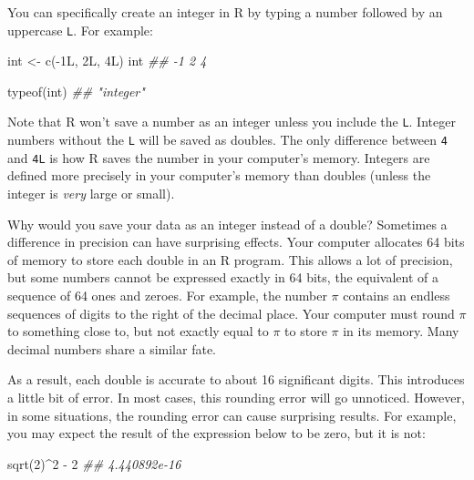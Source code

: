 \documentclass[
  letterpaper,
  DIV=11,
  numbers=noendperiod]{scrbook}
\newenvironment{Shaded}{\begin{snugshade}}{\end{snugshade}}
\newcommand{\DecValTok}[1]{\textcolor[rgb]{0.68,0.00,0.00}{#1}}
\newcommand{\DocumentationTok}[1]{\textcolor[rgb]{0.37,0.37,0.37}{\textit{#1}}}
\newcommand{\FunctionTok}[1]{\textcolor[rgb]{0.28,0.35,0.67}{#1}}
\newcommand{\NormalTok}[1]{\textcolor[rgb]{0.00,0.23,0.31}{#1}}
\newcommand{\OtherTok}[1]{\textcolor[rgb]{0.00,0.23,0.31}{#1}}
\newcommand{\SpecialCharTok}[1]{\textcolor[rgb]{0.37,0.37,0.37}{#1}}
\begin{document}
You can specifically create an integer in R by typing a number followed
by an uppercase \texttt{L}. For example:

\begin{Shaded}
\begin{Highlighting}[]
\NormalTok{int }\OtherTok{\textless{}{-}} \FunctionTok{c}\NormalTok{(}\SpecialCharTok{{-}}\DecValTok{1}\NormalTok{L, }\DecValTok{2}\NormalTok{L, }\DecValTok{4}\NormalTok{L)}
\NormalTok{int}
\DocumentationTok{\#\# {-}1  2  4}

\FunctionTok{typeof}\NormalTok{(int)}
\DocumentationTok{\#\# "integer"}
\end{Highlighting}
\end{Shaded}

Note that R won't save a number as an integer unless you include the
\texttt{L}. Integer numbers without the \texttt{L} will be saved as
doubles. The only difference between \texttt{4} and \texttt{4L} is how R
saves the number in your computer's memory. Integers are defined more
precisely in your computer's memory than doubles (unless the integer is
\emph{very} large or small).

Why would you save your data as an integer instead of a double?
Sometimes a difference in precision can have surprising effects. Your
computer allocates 64 bits of memory to store each double in an R
program. This allows a lot of precision, but some numbers cannot be
expressed exactly in 64 bits, the equivalent of a sequence of 64 ones
and zeroes. For example, the number \(\pi\) contains an endless
sequences of digits to the right of the decimal place. Your computer
must round \(\pi\) to something close to, but not exactly equal to
\(\pi\) to store \(\pi\) in its memory. Many decimal numbers share a
similar fate.

As a result, each double is accurate to about 16 significant digits.
This introduces a little bit of error. In most cases, this rounding
error will go unnoticed. However, in some situations, the rounding error
can cause surprising results. For example, you may expect the result of
the expression below to be zero, but it is not:

\begin{Shaded}
\begin{Highlighting}[]
\FunctionTok{sqrt}\NormalTok{(}\DecValTok{2}\NormalTok{)}\SpecialCharTok{\^{}}\DecValTok{2} \SpecialCharTok{{-}} \DecValTok{2}
\DocumentationTok{\#\# 4.440892e{-}16}
\end{Highlighting}
\end{Shaded}
\end{document}
